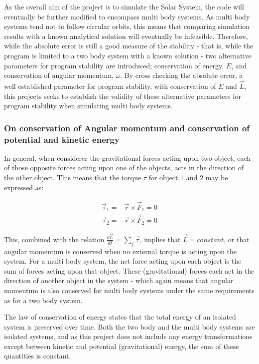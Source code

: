 \documentclass[%
oneside,                 %
final,                   %
10pt]{article}
\begin{document}
As the overall aim of the project is to simulate the Solar System, the code will eventually be further modified to encompass multi body systems. As multi body systems tend not to follow circular orbits, this means that comparing simulation results with a known analytical solution will eventually be infeasible. Therefore, while the absolute error is still a good measure of the stability - that is, while the program is limited to a two body system with a known solution - two alternative parameters for program stability are introduced; conservation of energy, $E$, and  conservation of angular momentum, $\omega$. By cross checking the absolute error, a well established parameter for program stability, with conservation of $E$ and $\vec{L}$, this projects seeks to establish the validity of these alternative parameters for program stability when simulating multi body systems. \newline

\subsubsection*{On conservation of Angular momentum and conservation of potential and kinetic energy}
In general, when considerer the gravitational forces acting upon  two object, each of those opposite forces acting upon one of the objects, acts in the direction of the other object. This means that the torque $\tau$ for object $1$ and $2$ may be expressed as: 

\begin{align*}
\vec{\tau}_1 =& \vec{r} \times \vec{F}_1 = 0 \\
\vec{\tau}_2 =& \vec{r} \times \vec{F}_2 = 0
\end{align*}

This, combined with the relation $\frac{d \vec{L}}{dt} = \sum_j \vec{\tau}$, implies that $\vec{L} = constant$, or that angular momentum is conserved when no external torque is acting upon the system. For a multi body system, the net force acting upon each object is the sum of forces acting upon that object. These (gravitational) forces each act in the direction of another object in the system - which again means that angular momentum is also conserved for multi body systems under the same requirements as for a two body system. \newline

The law of conservation of energy states that the total energy of an isolated system is preserved over time. Both the two body and  the multi body systems are isolated systems, and as this project does not include any energy transformations except between kinetic and potential (gravitational) energy, the sum of these quantities  is constant. \newline
\end{document}
